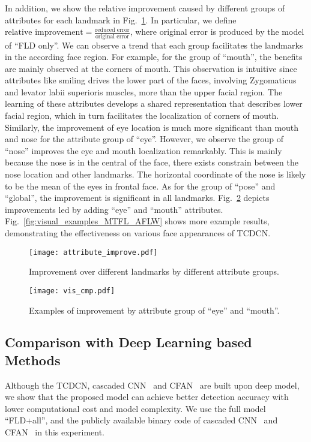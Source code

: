 \documentclass[10pt,journal,compsoc]{IEEEtran}
\begin{document}
In addition, we show the relative improvement caused by different groups of attributes for each landmark in Fig.~\ref{fig:model_improvement}. In particular, we define $\textrm{relative improvement} = \frac{\textrm{reduced error}}{\textrm{original error}}$, where original error is produced by the model of ``FLD only''. We can observe a trend that each group facilitates the landmarks in the according face region. For example, for the group of ``mouth'', the benefits are mainly observed at the corners of mouth. This observation is intuitive since attributes like smiling drives the lower part of the faces, involving Zygomaticus and levator labii superioris muscles, more than the upper facial region. The learning of these attributes develops a shared representation that describes lower facial region, which in turn facilitates the localization of corners of mouth. Similarly, the improvement of eye location is much more significant than mouth and nose for the attribute group of ``eye''. However, we observe the group of ``nose'' improves the eye and mouth localization remarkably. This is mainly because the nose is in the central of the face, there exists constrain between the nose location and other landmarks. The horizontal coordinate of the nose is likely to be the mean of the eyes in frontal face. As for the group of ``pose'' and ``global'', the improvement is significant in all landmarks. Fig.~\ref{fig:vis_improvement} depicts improvements led by adding ``eye'' and ``mouth'' attributes. Fig.~\ref{fig:visual_examples_MTFL_AFLW} shows more example results, demonstrating the effectiveness on various face appearances of TCDCN.

\begin{figure}
  \centering
  \texttt{[image: attribute\_improve.pdf]}\\
  \vskip -0.3cm
  \caption{Improvement over different landmarks by different attribute groups.}
  \label{fig:model_improvement}

\end{figure}
\begin{figure}
  \centering
  \texttt{[image: vis\_cmp.pdf]}\\
  \vskip -0.3cm
  \caption{Examples of improvement by attribute group of ``eye'' and ``mouth''.}
  \label{fig:vis_improvement}

\end{figure}


\subsection{Comparison with Deep Learning based Methods}
\label{subset:cmp_deep}
Although the TCDCN, cascaded CNN~\cite{Sun2013} and CFAN~\cite{zhang2014coarse} are built upon deep model, we show that the proposed model can achieve better detection accuracy with lower computational cost and model complexity. We use the full model ``FLD+all'', and the publicly available binary code of cascaded CNN~\cite{Sun2013} and CFAN~\cite{zhang2014coarse} in this experiment.
\end{document}
